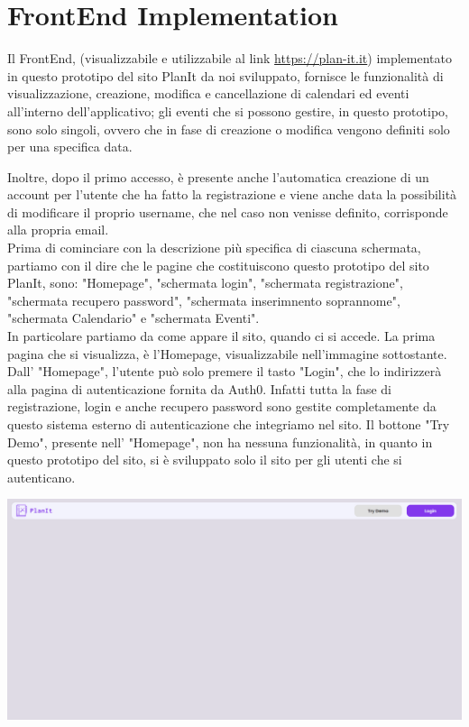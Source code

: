 \section{FrontEnd Implementation}
\label{secD4:FrontEndImplementation}
Il FrontEnd, (visualizzabile e utilizzabile al link \href{https://plan-it.it} {https://plan-it.it}) implementato in questo prototipo del sito PlanIt da noi sviluppato, fornisce le funzionalità di visualizzazione, creazione, modifica e cancellazione di calendari ed eventi all'interno dell'applicativo; gli eventi che si possono gestire, in questo prototipo, sono solo singoli, ovvero che in fase di creazione o modifica vengono definiti solo per una specifica data.

Inoltre, dopo il primo accesso, è presente anche l'automatica creazione di un account per l'utente che ha fatto la registrazione e viene anche data la possibilità di modificare il proprio username, che nel caso non venisse definito, corrisponde alla propria email. \\ Prima di cominciare con la descrizione più specifica di ciascuna schermata, partiamo con il dire che le pagine che costituiscono questo prototipo del sito PlanIt, sono: "Homepage", "schermata login", "schermata registrazione", "schermata recupero password", "schermata inserimnento soprannome", "schermata Calendario" e "schermata Eventi".
\\ In particolare partiamo da come appare il sito, quando ci si accede. La prima pagina che si visualizza, è l'Homepage, visualizzabile nell'immagine sottostante. Dall' "Homepage", l'utente può solo premere il tasto "Login", che lo indirizzerà alla pagina di autenticazione fornita da Auth0. Infatti tutta la fase di registrazione, login e anche recupero password sono gestite completamente da questo sistema esterno di autenticazione che integriamo nel sito. Il bottone "Try Demo", presente nell' "Homepage", non ha nessuna funzionalità, in quanto in questo prototipo del sito, si è sviluppato solo il sito per gli utenti che si autenticano.
\begin{center}
    \includegraphics[width=1\textwidth, height=0.3\textheight]{img/png/FrontEnd/Homepage_Autenticazione/Homepage.png}
\end{center}
